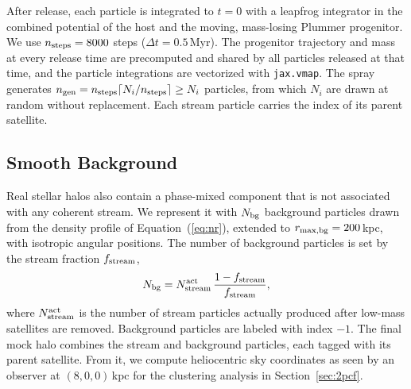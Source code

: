After release, each particle is integrated to $t = 0$ with a leapfrog integrator in the
combined potential of the host and the moving, mass-losing Plummer progenitor. We use
$n_{\rm steps} = 8000$ steps ($\Delta t = 0.5$\,Myr). The progenitor trajectory and mass at
every release time are precomputed and shared by all particles released at that time, and
the particle integrations are vectorized with \texttt{jax.vmap}. The spray generates
$n_{\rm gen} = n_{\rm steps}\lceil N_i/n_{\rm steps}\rceil \ge N_i$ particles, from which
$N_i$ are drawn at random without replacement. Each stream particle carries the index of its
parent satellite.

\subsection{Smooth Background} \label{sec:mock_bg}

Real stellar halos also contain a phase-mixed component that is not associated with any
coherent stream. We represent it with $N_{\rm bg}$ background particles drawn from the
density profile of Equation~(\ref{eq:nr}), extended to $r_{\rm max,bg} = 200$\,kpc, with
isotropic angular positions. The number of background particles is set by the stream
fraction $f_{\rm stream}$,
\begin{equation}
    N_{\rm bg} = N_{\rm stream}^{\rm act}\,\frac{1 - f_{\rm stream}}{f_{\rm stream}},
\end{equation}
where $N_{\rm stream}^{\rm act}$ is the number of stream particles actually produced after
low-mass satellites are removed. Background particles are labeled with index $-1$. The
final mock halo combines the stream and background particles, each tagged with its parent
satellite. From it, we compute heliocentric sky coordinates as seen by an observer at
$(8, 0, 0)$\,kpc for the clustering analysis in Section~\ref{sec:2pcf}.

